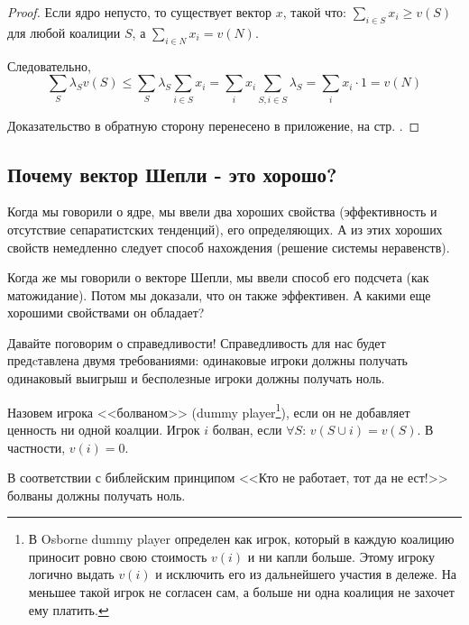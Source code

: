 \begin{proof}
Если ядро непусто, то существует вектор $x$, такой что: $\sum_{i\in S} x_{i}\geq v(S)$ для любой коалиции $S$, а $  \sum_{i\in N} x_{i}= v(N)$.

Следовательно,
\begin{equation}
\sum_{S} \lambda_{S}v(S) \leq \sum_{S} \lambda_{S} \sum_{i\in S} x_{i} =
\sum_{i}x_{i}\sum_{S, i\in S}\lambda_{S}=\sum_{i}x_{i}\cdot 1=v(N)
\end{equation}

Доказательство в обратную сторону перенесено в приложение, на стр. \pageref{bond.proof}.
\end{proof}


\subsection{Почему вектор Шепли - это хорошо?}

Когда мы говорили о ядре, мы ввели два хороших свойства (эффективность и отсутствие сепаратистских тенденций), его определяющих. А из этих хороших свойств немедленно следует способ нахождения (решение системы неравенств).

Когда же мы говорили о векторе Шепли, мы ввели способ его подсчета (как матожидание). Потом мы доказали, что он также эффективен. А какими еще хорошими свойствами он обладает?

Давайте поговорим о справедливости! Справедливость для нас будет предcтавлена двумя требованиями: одинаковые игроки должны получать одинаковый выигрыш и бесполезные игроки должны получать ноль.

\begin{mydef}
Назовем игрока <<болваном>>  (dummy player\footnote{В Osborne \cite{osborne:cgt} dummy player определен как игрок, который в каждую коалицию приносит ровно свою стоимость $v(i)$ и ни капли больше. Этому игроку логично выдать $v(i)$ и исключить его из дальнейшего участия в дележе. На меньшее такой игрок не согласен сам, а больше ни одна коалиция не захочет ему платить.}), если он не добавляет ценность ни одной коалции. Игрок $i$ болван, если $\forall S$: $v(S\cup i)=v(S)$. В частности, $v(i)=0$.
\end{mydef}

В соответствии с библейским принципом <<Кто не работает, тот да не ест!>> болваны должны получать ноль.

